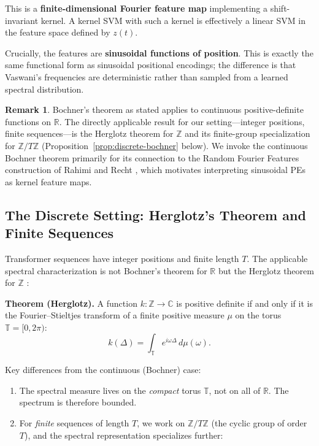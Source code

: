 \documentclass[11pt]{article}
\theoremstyle{definition}
\newtheorem{remark}[theorem]{Remark}
\begin{document}
This is a \textbf{finite-dimensional Fourier feature map} implementing a shift-invariant kernel. A kernel SVM with such a kernel is effectively a linear SVM in the feature space defined by \(z(t)\).

Crucially, the features are \textbf{sinusoidal functions of position}. This is exactly the same functional form as sinusoidal positional encodings; the difference is that Vaswani's frequencies are deterministic rather than sampled from a learned spectral distribution.

\begin{remark}
Bochner's theorem as stated applies to continuous positive-definite functions on $\mathbb{R}$. The directly applicable result for our setting---integer positions, finite sequences---is the Herglotz theorem for $\mathbb{Z}$ and its finite-group specialization for $\mathbb{Z}/T\mathbb{Z}$ (Proposition~\ref{prop:discrete-bochner} below). We invoke the continuous Bochner theorem primarily for its connection to the Random Fourier Features construction of Rahimi and Recht \cite{rahimi2007random}, which motivates interpreting sinusoidal PEs as kernel feature maps.
\end{remark}

\subsection{The Discrete Setting: Herglotz's Theorem and Finite Sequences}

Transformer sequences have integer positions and finite length $T$. The applicable spectral characterization is not Bochner's theorem for $\mathbb{R}$ but the Herglotz theorem for $\mathbb{Z}$ \cite{herglotz1911,rudin1962fourier}:

\medskip
\noindent
\textbf{Theorem (Herglotz).} A function $k : \mathbb{Z} \to \mathbb{C}$ is positive definite if and only if it is the Fourier--Stieltjes transform of a finite positive measure $\mu$ on the torus $\mathbb{T} = [0, 2\pi)$:
\[
k(\Delta) = \int_{\mathbb{T}} e^{i\omega \Delta}\, d\mu(\omega).
\]

\noindent
Key differences from the continuous (Bochner) case:
\begin{enumerate}
    \item The spectral measure lives on the \emph{compact} torus $\mathbb{T}$, not on all of $\mathbb{R}$. The spectrum is therefore bounded.
    \item For \emph{finite} sequences of length $T$, we work on $\mathbb{Z}/T\mathbb{Z}$ (the cyclic group of order $T$), and the spectral representation specializes further:
\end{enumerate}
\end{document}
